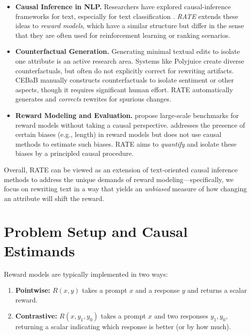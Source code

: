 \documentclass{article}
\theoremstyle{definition}
\begin{document}
\begin{itemize}
    \item \textbf{Causal Inference in NLP.} Researchers have explored causal-inference frameworks for text, especially for text classification \cite{feder2022causalinferencenaturallanguage}. \emph{RATE} extends these ideas to \emph{reward models}, which have a similar structure but differ in the sense that they are often used for reinforcement learning or ranking scenarios.
    \item \textbf{Counterfactual Generation.} Generating minimal textual edits to isolate one attribute is an active research area. Systems like Polyjuice \cite{wu2021polyjuicegeneratingcounterfactualsexplaining} create diverse counterfactuals, but often do not explicitly correct for rewriting artifacts. CEBaB \cite{abraham2022cebab} manually constructs counterfactuals to isolate sentiment or other aspects, though it requires significant human effort. RATE automatically generates and \emph{corrects} rewrites for spurious changes.
    \item \textbf{Reward Modeling and Evaluation.} \cite{lambert2024rewardbenchevaluatingrewardmodels} propose large-scale benchmarks for reward models without taking a causal perspective. \cite{park2024offsetbias} addresses the presence of certain biases (e.g., length) in reward models but does not use causal methods to estimate such biases. RATE aims to \emph{quantify} and isolate these biases by a principled causal procedure.
\end{itemize}

Overall, RATE can be viewed as an extension of text-oriented causal inference methods to address the unique demands of reward modeling—specifically, we focus on rewriting text in a way that yields an \emph{unbiased} measure of how changing an attribute will shift the reward.

\section{Problem Setup and Causal Estimands}
\label{sec:setup}

Reward models are typically implemented in two ways:

\begin{enumerate}
  \item \textbf{Pointwise:} $R(x, y)$ takes a prompt $x$ and a response $y$ and returns a scalar reward.  
  \item \textbf{Contrastive:} $R(x, y_1, y_0)$ takes a prompt $x$ and two responses $y_1, y_0$, returning a scalar indicating which response is better (or by how much).
\end{enumerate}
\end{document}
